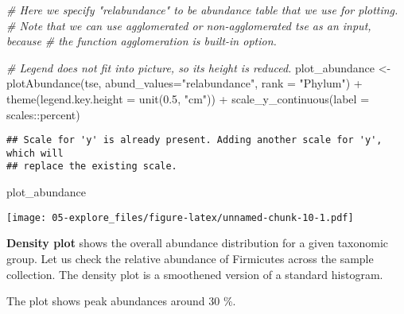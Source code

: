 \documentclass[
  oneside]{book}
\newenvironment{Shaded}{\begin{snugshade}}{\end{snugshade}}
\newcommand{\AttributeTok}[1]{\textcolor[rgb]{0.77,0.63,0.00}{#1}}
\newcommand{\CommentTok}[1]{\textcolor[rgb]{0.56,0.35,0.01}{\textit{#1}}}
\newcommand{\FloatTok}[1]{\textcolor[rgb]{0.00,0.00,0.81}{#1}}
\newcommand{\FunctionTok}[1]{\textcolor[rgb]{0.00,0.00,0.00}{#1}}
\newcommand{\NormalTok}[1]{#1}
\newcommand{\OtherTok}[1]{\textcolor[rgb]{0.56,0.35,0.01}{#1}}
\newcommand{\SpecialCharTok}[1]{\textcolor[rgb]{0.00,0.00,0.00}{#1}}
\newcommand{\StringTok}[1]{\textcolor[rgb]{0.31,0.60,0.02}{#1}}
\begin{document}
\begin{Shaded}
\begin{Highlighting}[]
\CommentTok{\# Here we specify "relabundance" to be abundance table that we use for plotting.}
\CommentTok{\# Note that we can use agglomerated or non{-}agglomerated tse as an input, because}
\CommentTok{\# the function agglomeration is built{-}in option. }

\CommentTok{\# Legend does not fit into picture, so its height is reduced.}
\NormalTok{plot\_abundance }\OtherTok{\textless{}{-}} \FunctionTok{plotAbundance}\NormalTok{(tse, }\AttributeTok{abund\_values=}\StringTok{"relabundance"}\NormalTok{, }\AttributeTok{rank =} \StringTok{"Phylum"}\NormalTok{) }\SpecialCharTok{+}
  \FunctionTok{theme}\NormalTok{(}\AttributeTok{legend.key.height =} \FunctionTok{unit}\NormalTok{(}\FloatTok{0.5}\NormalTok{, }\StringTok{"cm"}\NormalTok{)) }\SpecialCharTok{+}
  \FunctionTok{scale\_y\_continuous}\NormalTok{(}\AttributeTok{label =}\NormalTok{ scales}\SpecialCharTok{::}\NormalTok{percent)}
\end{Highlighting}
\end{Shaded}

\begin{verbatim}
## Scale for 'y' is already present. Adding another scale for 'y', which will
## replace the existing scale.
\end{verbatim}

\begin{Shaded}
\begin{Highlighting}[]
\NormalTok{plot\_abundance }
\end{Highlighting}
\end{Shaded}

\texttt{[image: 05-explore\_files/figure-latex/unnamed-chunk-10-1.pdf]}

\textbf{Density plot} shows the overall abundance distribution for a given
taxonomic group. Let us check the relative abundance of Firmicutes
across the sample collection. The density plot is a smoothened
version of a standard histogram.

The plot shows peak abundances around 30 \%.
\end{document}
